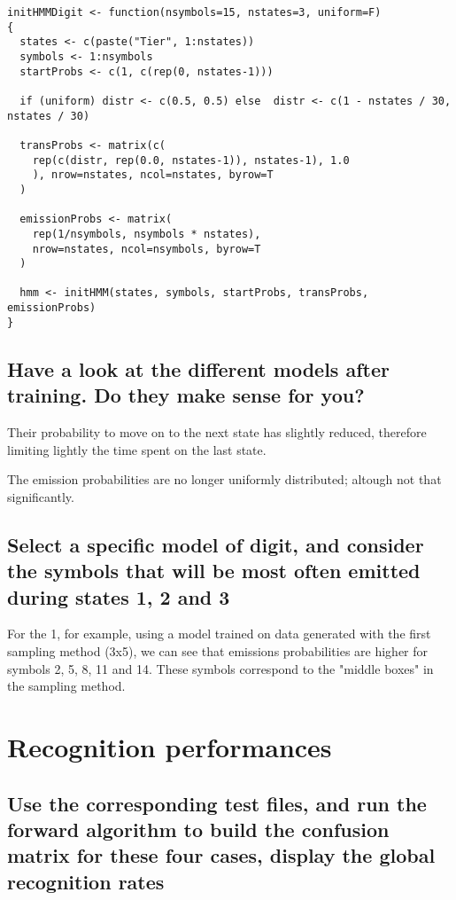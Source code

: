 \documentclass[a4paper]{article}
\begin{document}
\begin{lstlisting}
initHMMDigit <- function(nsymbols=15, nstates=3, uniform=F)
{
  states <- c(paste("Tier", 1:nstates))
  symbols <- 1:nsymbols
  startProbs <- c(1, c(rep(0, nstates-1)))
  
  if (uniform) distr <- c(0.5, 0.5) else  distr <- c(1 - nstates / 30, nstates / 30)
  
  transProbs <- matrix(c(
    rep(c(distr, rep(0.0, nstates-1)), nstates-1), 1.0
    ), nrow=nstates, ncol=nstates, byrow=T
  )
  
  emissionProbs <- matrix(
    rep(1/nsymbols, nsymbols * nstates),
    nrow=nstates, ncol=nsymbols, byrow=T
  )
  
  hmm <- initHMM(states, symbols, startProbs, transProbs, emissionProbs)
}
\end{lstlisting}

\subsection{Have a look at the different models after training. Do they make sense for you?}

Their probability to move on to the next state has slightly reduced, therefore limiting lightly the time spent on the last state. \newline

The emission probabilities are no longer uniformly distributed; altough not that significantly. \newline

\subsection{Select a specific model of digit, and consider the symbols that will be most often emitted during states 1, 2 and 3}

For the 1, for example, using a model trained on data generated with the first sampling method (3x5), we can see that emissions probabilities are higher for symbols 2, 5, 8, 11 and 14. These symbols correspond to the "middle boxes" in the sampling method.

\section{Recognition performances}

\subsection{Use the corresponding test files, and run the forward algorithm to build the confusion
matrix for these four cases, display the global recognition rates}
\end{document}
